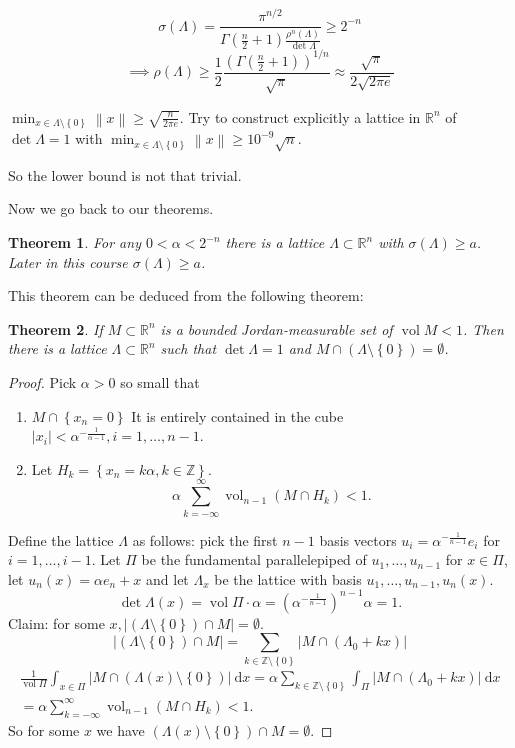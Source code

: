\documentclass{report}
\newcommand{\R}{\mathbb{R}}
\newcommand{\Z}{\mathbb{Z}}
\newcommand{\vol}{\operatorname{vol}}
\newcommand{\idf}{\ \mathrm{d}}
\newcommand{\norm}[1]{\left\| #1 \right\|}
\newcommand{\set}[1]{\left\{ #1 \right\}}
\newcommand{\abs}[1]{\left| #1 \right|}
\newtheorem{theorem}{Theorem}[section]
\theoremstyle{definition}
\theoremstyle{remark}
\numberwithin{equation}{section}
\begin{document}
\[\sigma(\Lambda) = \frac{\pi^{n/2}}{\Gamma\left(\frac{n}{2}+1\right)\frac{\rho^n(\Lambda)}{\det \Lambda}} \geq 2^{-n}\]\[\implies \rho(\Lambda) \geq \frac{1}{2}\frac{\left(\Gamma\left(\frac{n}{2}+1\right)\right)^{1/n}}{\sqrt{\pi}} \approx \frac{\sqrt{\pi}}{2\sqrt{2\pi e}}\]

$\min_{x \in \Lambda\setminus \set{0}} \norm{x} \geq \sqrt{\frac{n}{2\pi e}}$. Try to construct explicitly a lattice in $\R^n$ of $\det \Lambda = 1$ with $\min_{x \in \Lambda \setminus \set{0}} \norm{x} \geq 10^{-9}\sqrt{n}$.

So the lower bound is not that trivial.

Now we go back to our theorems.
\begin{theorem}
    For any $0 < \alpha < 2^{-n}$ there is a lattice $\Lambda \subset  \R^n$ with $\sigma(\Lambda) \geq a$. Later in this course $\sigma (\Lambda) \geq a$.
\end{theorem}
This theorem can be deduced from the following theorem:
\begin{theorem}
    If $M \subset \R^n$ is a bounded Jordan-measurable set of $\vol M < 1$. Then there is a lattice $\Lambda \subset \R^n$ such that $\det \Lambda = 1$ and $M \cap (\Lambda \setminus \set{0}) = \emptyset$.
\end{theorem}
\begin{proof}
    Pick $\alpha > 0$ so small that \begin{enumerate}
        \item $M \cap \set{x_n = 0}$ It is entirely contained in the cube $|x_i| < \alpha^{-\frac{1}{\alpha-1}}, i = 1, \ldots, n-1$.
        \item Let $H_k = \set{x_n = k\alpha, k \in \Z}$. \[\alpha \sum_{k=-\infty}^\infty \vol_{n-1}(M \cap H_k) < 1.\]
    \end{enumerate}
    Define the lattice $\Lambda$ as follows: pick the first $n - 1$ basis vectors $u_i = \alpha^{-\frac{1}{n-1}}e_i$ for $i = 1, \ldots, i-1$.
    Let $\Pi$ be the fundamental parallelepiped of $u_1, \ldots, u_{n-1}$ for $x \in \Pi$, let $u_n(x) = \alpha e_n + x$ and let $\Lambda_x$ be the lattice with basis $u_1, \ldots, u_{n-1}, u_n(x)$. 
    \[\det \Lambda(x) = \vol \Pi \cdot \alpha = \left(\alpha^{-\frac{1}{n-1}}\right)^{n-1}\alpha = 1.\]
    Claim: for some $x, |(\Lambda \setminus \set{0}) \cap M| = \emptyset$.
    \[|(\Lambda \setminus \set{0}) \cap M| = \sum_{k \in \Z \setminus \set{0}} |M \cap (\Lambda_0 + kx)|\]
    \begin{multline*}\frac{1}{\vol\Pi}\int_{x \in \Pi} \abs{M \cap (\Lambda(x) \setminus \set{0})} \idf x= \alpha \sum_{k \in \Z \setminus \set{0}} \int_\Pi |M\cap(\Lambda_0 + kx)| \idf x \\ = \alpha \sum_{k=-\infty}^\infty \vol_{n-1}(M \cap H_k) < 1.\end{multline*}
    So for some $x$ we have $(\Lambda(x) \setminus \set{0}) \cap M = \emptyset$.
\end{proof}
\end{document}
